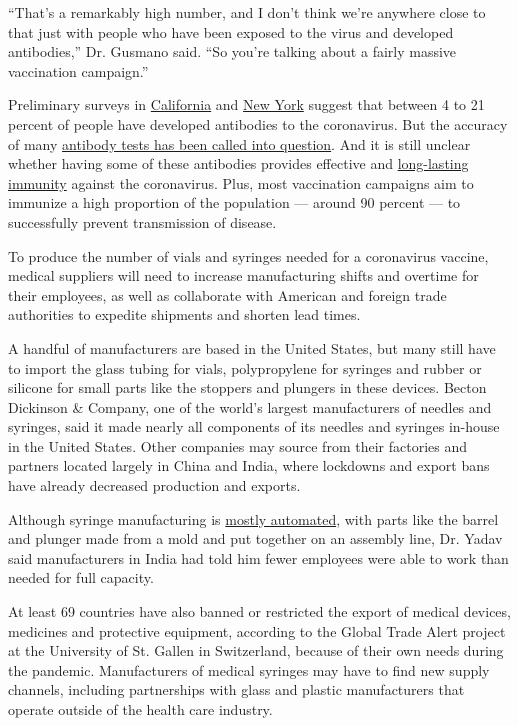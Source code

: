 ``That's a remarkably high number, and I don't think we're anywhere
close to that just with people who have been exposed to the virus and
developed antibodies,'' Dr. Gusmano said. ``So you're talking about a
fairly massive vaccination campaign.''

Preliminary surveys in
\href{https://www.nytimes3xbfgragh.onion/2020/04/21/health/coronavirus-antibodies-california.html}{California}
and
\href{https://www.nytimes3xbfgragh.onion/2020/04/23/nyregion/coronavirus-antibodies-test-ny.html}{New
York} suggest that between 4 to 21 percent of people have developed
antibodies to the coronavirus. But the accuracy of many
\href{https://www.nytimes3xbfgragh.onion/2020/04/19/us/coronavirus-antibody-tests.html}{antibody
tests has been called into question}. And it is still unclear whether
having some of these antibodies provides effective and
\href{https://www.nytimes3xbfgragh.onion/reuters/2020/04/25/world/americas/25reuters-health-coronavirus-who.html}{long-lasting
immunity} against the coronavirus. Plus, most vaccination campaigns aim
to immunize a high proportion of the population --- around 90 percent
--- to successfully prevent transmission of disease.

To produce the number of vials and syringes needed for a coronavirus
vaccine, medical suppliers will need to increase manufacturing shifts
and overtime for their employees, as well as collaborate with American
and foreign trade authorities to expedite shipments and shorten lead
times.

A handful of manufacturers are based in the United States, but many
still have to import the glass tubing for vials, polypropylene for
syringes and rubber or silicone for small parts like the stoppers and
plungers in these devices. Becton Dickinson \& Company, one of the
world's largest manufacturers of needles and syringes, said it made
nearly all components of its needles and syringes in-house in the United
States. Other companies may source from their factories and partners
located largely in China and India, where lockdowns and export bans have
already decreased production and exports.

Although syringe manufacturing is
\href{https://www.youtube.com/watch?v=EFQApDeslS0\&feature=youtu.be}{mostly
automated}, with parts like the barrel and plunger made from a mold and
put together on an assembly line, Dr. Yadav said manufacturers in India
had told him fewer employees were able to work than needed for full
capacity.

At least 69 countries have also banned or restricted the export of
medical devices, medicines and protective equipment, according to the
Global Trade Alert project at the University of St. Gallen in
Switzerland, because of their own needs during the pandemic.
Manufacturers of medical syringes may have to find new supply channels,
including partnerships with glass and plastic manufacturers that operate
outside of the health care industry.

